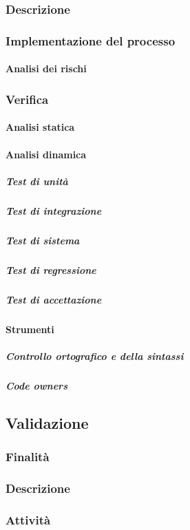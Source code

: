 \documentclass[../norme-di-progetto.tex]{subfiles}
\begin{document}
\subsubsection{Descrizione}
\subsubsection{Implementazione del processo}
\paragraph{Analisi dei rischi}
\subsubsection{Verifica}
\paragraph{Analisi statica}
\paragraph{Analisi dinamica}
\subparagraph{Test di unità}
\subparagraph{Test di integrazione}
\subparagraph{Test di sistema}
\subparagraph{Test di regressione}
\subparagraph{Test di accettazione}
\paragraph{Strumenti}
\subparagraph{Controllo ortografico e della sintassi}
\subparagraph{Code owners}
\subsection{Validazione}
\subsubsection{Finalità}
\subsubsection{Descrizione}
\subsubsection{Attività}
\end{document}
